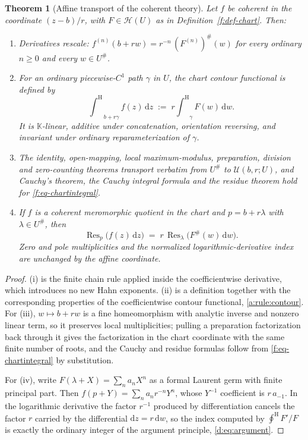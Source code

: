\documentclass[11pt,a4paper]{article}
\numberwithin{equation}{section}
\newtheorem{theorem}{Theorem}[section]
\theoremstyle{definition}
\theoremstyle{remark}
\theoremstyle{plain}
\newcommand{\K}{\mathbb K}
\newcommand{\halo}[1]{#1^{\#}}
\newcommand{\ev}[1]{#1^{\#}}
\newcommand{\Hc}{\mathcal H}
\newcommand{\intH}{{\int^{\mathrm H}}}
\newcommand{\ointH}{{\oint^{\mathrm H}}}
\DeclareMathOperator{\Res}{Res}                 %
\newcommand{\Resat}[1]{\Res_{#1}}               %
\newcommand{\dd}{\mathrm d}
\begin{document}
\begin{theorem}[Affine transport of the coherent theory]\label{f:thm-affine}
Let $f$ be coherent in the coordinate $(z-b)/r$, with $F\in\Hc(U)$ as in
Definition~\textup{\ref{f:def-chart}}.  Then:
\begin{enumerate}[label=\textup{(\roman*)},leftmargin=2.4em]
\item Derivatives rescale:
 $f^{(n)}(b+rw)=r^{-n}\,\ev{(F^{(n)})}(w)$ for every ordinary
 $n\ge0$ and every $w\in\halo U$.
\item For an ordinary piecewise-$C^{1}$ path $\gamma$ in $U$, the chart
 contour functional is \emph{defined} by
 \begin{equation}\label{f:eq-chartintegral}
  \intH_{\,b+r\gamma}f(z)\,\dd z\;:=\;r\intH_{\gamma}F(w)\,\dd w .
 \end{equation}
 It is $\K$-linear, additive under concatenation, orientation
 reversing, and invariant under ordinary reparameterization of
 $\gamma$.
\item The identity, open-mapping, local maximum-modulus, preparation,
 division and zero-counting theorems transport verbatim from
 $\halo U$ to $\mathcal U(b,r;U)$, and Cauchy's theorem, the Cauchy
 integral formula and the residue theorem hold for
 \eqref{f:eq-chartintegral}.
\item If $f$ is a coherent meromorphic quotient in the chart and
 $p=b+r\lambda$ with $\lambda\in\halo U$, then
 \begin{equation}\label{f:eq-scaledresidue}
  \Resat{p}\bigl(f(z)\,\dd z\bigr)
  \;=\;r\,\Resat{\lambda}\bigl(\ev F(w)\,\dd w\bigr).
 \end{equation}
 Zero and pole multiplicities and the normalized logarithmic-derivative
 index are unchanged by the affine coordinate.
\end{enumerate}
\end{theorem}

\begin{proof}
(i) is the finite chain rule applied inside the coefficientwise
derivative, which introduces no new Hahn exponents.  (ii) is a
definition together with the corresponding properties of the
coefficientwise contour functional, \ref{a:rule:contour}.  For (iii), $w\mapsto b+rw$ is a
fine homeomorphism with analytic inverse and nonzero linear term, so it
preserves local multiplicities; pulling a preparation factorization
back through it gives the factorization in the chart coordinate with the
same finite number of roots, and the Cauchy and residue formulas follow
from \eqref{f:eq-chartintegral} by substitution.

For (iv), write $F(\lambda+X)=\sum_{n}a_{n}X^{n}$ as a formal Laurent
germ with finite principal part.  Then
$f(p+Y)=\sum_{n}a_{n}r^{-n}Y^{n}$, whose $Y^{-1}$ coefficient is
$r\,a_{-1}$.  In the logarithmic derivative the factor $r^{-1}$ produced
by differentiation cancels the factor $r$ carried by the differential
$\dd z=r\,\dd w$, so the index computed by
$\ointH F'/F$ is exactly the ordinary integer of the argument
principle, \ref{d:eq:argument}.
\end{proof}
\end{document}

